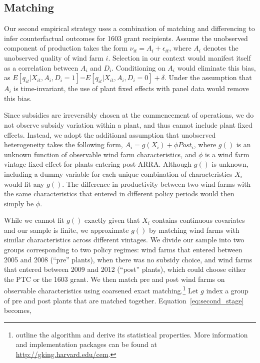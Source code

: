 \documentclass[12pt]{article}
\begin{document}
\subsection{Matching \label{subsec:Matching}}

Our second empirical strategy uses a combination of matching and differencing to infer counterfactual outcomes for 1603 grant recipients. Assume the unobserved component of production takes the form $\nu_{it}=A_{i}+\epsilon_{it}$, where $A_{i}$ denotes the unobserved quality of wind farm $i$. Selection in our context would manifest itself as a correlation between $A_{i}$ and $D_{i}$. Conditioning on $A_{i}$ would eliminate this bias, as $E[q_{it}|X_{it},A_{i},D_{i}=1]$=$E[q_{it}|X_{it},A_{i},D_{i}=0]+\delta$. Under the assumption that $A_{i}$ is time-invariant, the use of plant fixed effects with panel data would remove this bias.

Since subsidies are irreversibly chosen at the commencement of operations, we do not observe subsidy variation within a plant, and thus cannot include plant fixed effects. Instead, we adopt the additional assumption that unobserved heterogeneity takes the following form, $A_{i}=g(X_{i})+\phi Post_{i}$, where $g()$ is an unknown function of observable wind farm characteristics, and $\phi$ is a wind farm vintage fixed effect for plants entering post-ARRA. Although $g()$ is unknown, including a dummy variable for each unique combination of characteristics $X_{i}$ would fit any $g()$. The difference in productivity between two wind farms with the same characteristics that entered in different policy periods would then simply be $\phi$.

While we cannot fit $g()$ exactly given that $X_{i}$ contains continuous covariates and our sample is finite, we approximate $g()$ by matching wind farms with similar characteristics across different vintages. We divide our sample into two groups corresponding to two policy regimes: wind farms that entered between 2005 and 2008 (``pre'' plants), when there was no subsidy choice, and wind farms that entered between 2009 and 2012 (``post'' plants), which could choose either the PTC or the 1603 grant. We then match pre and post wind farms on observable characteristics using coarsened exact matching.\footnote{\citet{iacus_causal_2012} outline the algorithm and derive its statistical properties. More information and implementation packages can be found at \href{http://gking.harvard.edu/cem}{http://gking.harvard.edu/cem}.} Let $g$ index a group of pre and post plants that are matched together. Equation~\ref{eq:second_stage} becomes, 
\end{document}
